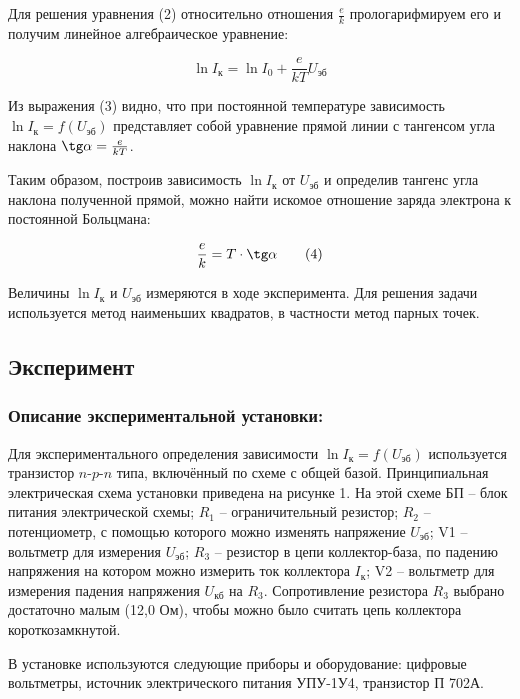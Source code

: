 \documentclass[a4paper,14pt]{extarticle}
\theoremstyle{plain}
\theoremstyle{remark}
\theoremstyle{definition}
\begin{document}
Для решения уравнения (2) относительно отношения $\frac{e}{k}$ прологарифмируем его и получим линейное алгебраическое уравнение:

\begin{equation}
    \ln I_{\text{к}} = \ln I_0 + \frac{e}{k T} U_{\text{эб}} \tag{3}
\end{equation}

Из выражения (3) видно, что при постоянной температуре зависимость $\ln I_{\text{к}} = f(U_{\text{эб}})$ представляет собой уравнение прямой линии с тангенсом угла наклона $\tg \alpha = \frac{e}{k T}$.

Таким образом, построив зависимость $\ln I_{\text{к}}$ от $U_{\text{эб}}$ и определив тангенс угла наклона полученной прямой, можно найти искомое отношение заряда электрона к постоянной Больцмана:

\begin{equation}
    \frac{e}{k} = T \cdot \tg \alpha \tag{4}
\end{equation}

Величины $\ln I_{\text{к}}$ и $U_{\text{эб}}$ измеряются в ходе эксперимента. Для решения задачи используется метод наименьших квадратов, в частности метод парных точек.


\subsection{Эксперимент}
\subsubsection{Описание экспериментальной установки:}
Для экспериментального определения зависимости $\ln I_{\text{к}} = f(U_{\text{эб}})$ используется транзистор $n$-$p$-$n$ типа, включённый по схеме с общей базой. Принципиальная электрическая схема установки приведена на рисунке 1. 
На этой схеме БП – блок питания электрической схемы; $R_1$ – ограничительный резистор; $R_2$ – потенциометр, с помощью которого можно изменять напряжение $U_{\text{эб}}$; V1 – вольтметр для измерения $U_{\text{эб}}$; $R_3$ – резистор в цепи коллектор-база, по падению напряжения на котором можно измерить ток коллектора $I_{\text{к}}$; V2 – вольтметр для измерения падения напряжения $U_{\text{кб}}$ на $R_3$. Сопротивление резистора $R_3$ выбрано достаточно малым (12,0 Ом), чтобы можно было считать цепь коллектора короткозамкнутой. 

В установке используются следующие приборы и оборудование: цифровые вольтметры, источник электрического питания УПУ-1У4, транзистор П 702А.
\end{document}
